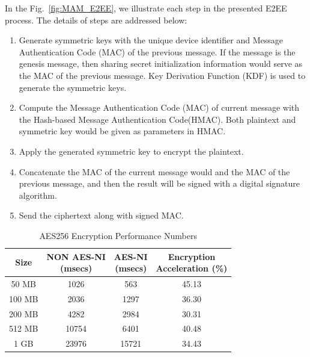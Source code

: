 \begin{spacing}{2.0}
In the Fig.~\ref{fig:MAM_E2EE}, we illustrate each step in the presented E2EE process. The details of steps are addressed below:

\begin{enumerate}
    \item Generate symmetric keys with the unique device identifier and Message Authentication Code (MAC) of the previous message. If the message is the genesis message, then sharing secret initialization information would serve as the MAC of the previous message. Key Derivation Function (KDF) is used to generate the symmetric keys.
    \item Compute the Message Authentication Code (MAC) of current message with the Hash-based Message Authentication Code(HMAC). Both plaintext and symmetric key would be given as parameters in HMAC.
    \item Apply the generated symmetric key to encrypt the plaintext.
    \item Concatenate the MAC of the current message would and the MAC of the previous message, and then the result will be signed with a digital signature algorithm.
    \item Send the ciphertext along with signed MAC.
\end{enumerate}

\begin{table}[htbp]
    \caption{AES256 Encryption Performance Numbers}
    \label{tab:AES_NI}
    \begin{center}
        \begin{tabular}{ |c||c|c|c|  }
            \hline
            Size& \makecell{NON AES-NI \\ (msecs)} & \makecell{AES-NI \\ (msecs)} & \makecell{Encryption \\ Acceleration (\%)} \\
            \hline
            50 MB  & 1026  & 563   & 45.13 \\
            100 MB & 2036  & 1297  & 36.30 \\
            200 MB & 4282  & 2984  & 30.31 \\
            512 MB & 10754 & 6401  & 40.48 \\
            1 GB   & 23976 & 15721 & 34.43 \\
            \hline
        \end{tabular}
    \end{center}
\end{table}


\end{spacing}
